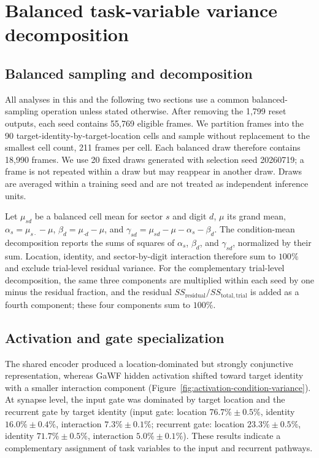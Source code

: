 \section{Balanced task-variable variance decomposition}
\label{app:variance-decomposition}

\subsection{Balanced sampling and decomposition}

All analyses in this and the following two sections use a common balanced-sampling operation unless stated otherwise. After removing the 1,799 reset outputs, each seed contains 55,769 eligible frames. We partition frames into the 90 target-identity-by-target-location cells and sample without replacement to the smallest cell count, 211 frames per cell. Each balanced draw therefore contains 18,990 frames. We use 20 fixed draws generated with selection seed 20260719; a frame is not repeated within a draw but may reappear in another draw. Draws are averaged within a training seed and are not treated as independent inference units.

Let \(\mu_{sd}\) be a balanced cell mean for sector \(s\) and digit \(d\), \(\mu\) its grand mean, \(\alpha_s=\mu_{s\cdot}-\mu\), \(\beta_d=\mu_{\cdot d}-\mu\), and \(\gamma_{sd}=\mu_{sd}-\mu-\alpha_s-\beta_d\). The condition-mean decomposition reports the sums of squares of \(\alpha_s\), \(\beta_d\), and \(\gamma_{sd}\), normalized by their sum. Location, identity, and sector-by-digit interaction therefore sum to \(100\%\) and exclude trial-level residual variance. For the complementary trial-level decomposition, the same three components are multiplied within each seed by one minus the residual fraction, and the residual \(SS_{\mathrm{residual}}/SS_{\mathrm{total,trial}}\) is added as a fourth component; these four components sum to \(100\%\).

\subsection{Activation and gate specialization}

The shared encoder produced a location-dominated but strongly conjunctive representation, whereas GaWF hidden activation shifted toward target identity with a smaller interaction component (Figure~\ref{fig:activation-condition-variance}). At synapse level, the input gate was dominated by target location and the recurrent gate by target identity (input gate: location \(76.7\%\pm0.5\%\), identity \(16.0\%\pm0.4\%\), interaction \(7.3\%\pm0.1\%\); recurrent gate: location \(23.3\%\pm0.5\%\), identity \(71.7\%\pm0.5\%\), interaction \(5.0\%\pm0.1\%\)). These results indicate a complementary assignment of task variables to the input and recurrent pathways.

